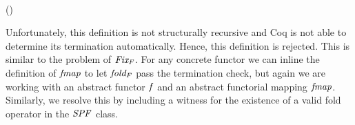 \begin{hscode}\SaveRestoreHook
{}%
%
%
\>[3]{}\mathbin{::}\;\Rightarrow {}\;\;\to {}\;\to {}\<[E]%
\\
\>[3]{}\;\mathrel{=}\;(\;)\<[E]%
\ColumnHook
\end{hscode}\resethooks
Unfortunately, this definition is not structurally recursive and Coq
is not able to determine its termination automatically. Hence, this
definition is rejected. This is similar to the problem of \ensuremath{\Varid{Fix_{F}}}. For
any concrete functor we can inline the definition of \ensuremath{\Varid{fmap}} to let
\ensuremath{\Varid{fold_{F}}} pass the termination check, but again we are working with an
abstract functor \ensuremath{\Varid{f}} and an abstract functorial mapping
\ensuremath{\Varid{fmap}}. Similarly, we resolve this by including a witness for the
existence of a valid fold operator in the \ensuremath{\Conid{SPF}} class.


